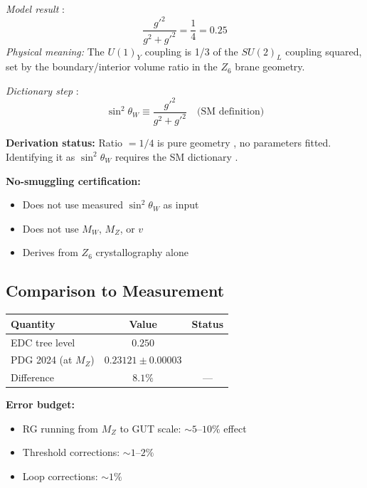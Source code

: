 \begin{tcolorbox}[colback=green!5!white, colframe=green!50!black,
    title=\textbf{Result: Tree-Level Coupling Ratio}]

\textit{Model result} \tagDerSym{}:
\begin{equation}
\boxed{\frac{g'^2}{g^2 + g'^2} = \frac{1}{4} = 0.25}
\label{eq:coupling_ratio_result}
\end{equation}
\emph{Physical meaning:} The $U(1)_Y$ coupling is 1/3 of the $SU(2)_L$ coupling squared,
set by the boundary/interior volume ratio in the $Z_6$ brane geometry.

\textit{Dictionary step} \tagDc{}:
\begin{equation}
\sin^2\theta_W \equiv \frac{g'^2}{g^2 + g'^2} \quad\text{(SM definition)}
\label{eq:weinberg_result}
\end{equation}

\textbf{Derivation status:} Ratio $= 1/4$ is pure geometry \tagDerSym{}, no parameters fitted.
Identifying it as $\sin^2\theta_W$ requires the SM dictionary \tagDc{}.

\textbf{No-smuggling certification:}
\begin{itemize}[nosep]
\item[$\checkmark$] Does not use measured $\sin^2\theta_W$ as input
\item[$\checkmark$] Does not use $M_W$, $M_Z$, or $v$
\item[$\checkmark$] Derives from $Z_6$ crystallography alone
\end{itemize}
\end{tcolorbox}

\subsection{Comparison to Measurement}

\begin{center}
\begin{tabular}{lcc}
\toprule
\textbf{Quantity} & \textbf{Value} & \textbf{Status} \\
\midrule
EDC tree level & $0.250$ & \tagDc{} \\
PDG 2024 (at $M_Z$) & $0.23121 \pm 0.00003$ & \tagBL{} \\
\midrule
Difference & $8.1\%$ & --- \\
\bottomrule
\end{tabular}
\end{center}

\textbf{Error budget:}
\begin{itemize}[nosep]
\item RG running from $M_Z$ to GUT scale: $\sim 5$--$10\%$ effect
\item Threshold corrections: $\sim 1$--$2\%$
\item Loop corrections: $\sim 1\%$
\end{itemize}

